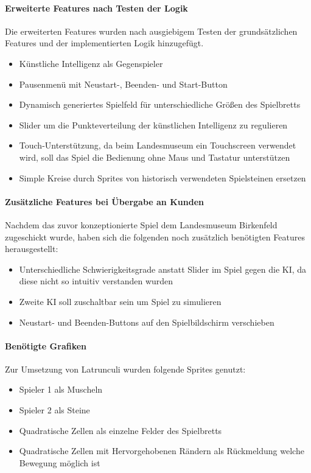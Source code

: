  \paragraph{Erweiterte Features nach Testen der Logik}
 Die erweiterten Features wurden nach ausgiebigem Testen der grundsätzlichen Features und der implementierten Logik hinzugefügt.
 \begin{itemize}
 \item Künstliche Intelligenz als Gegenspieler
 \item Pausenmenü mit Neustart-, Beenden- und Start-Button
 \item Dynamisch generiertes Spielfeld für unterschiedliche Größen des Spielbretts
 \item Slider um die Punkteverteilung der künstlichen Intelligenz zu regulieren
 \item Touch-Unterstützung, da beim Landesmuseum ein Touchscreen verwendet wird, soll das Spiel die Bedienung ohne Maus und Tastatur unterstützen
 \item Simple Kreise durch Sprites von historisch verwendeten Spielsteinen ersetzen
\end{itemize}


\paragraph{Zusätzliche Features bei Übergabe an Kunden}
Nachdem das zuvor konzeptionierte Spiel dem Landesmuseum Birkenfeld zugeschickt wurde, haben sich die folgenden noch zusätzlich benötigten Features herausgestellt:
\begin{itemize}
	\item Unterschiedliche Schwierigkeitsgrade anstatt Slider im Spiel gegen die KI, da diese nicht so intuitiv verstanden wurden
	\item Zweite KI soll zuschaltbar sein um Spiel zu simulieren
	\item Neustart- und Beenden-Buttons auf den Spielbildschirm verschieben	
\end{itemize}


\paragraph{Benötigte Grafiken}
Zur Umsetzung von Latrunculi wurden folgende Sprites genutzt:
\begin{itemize}
	\item Spieler 1 als Muscheln
	\item Spieler 2 als Steine
	\item Quadratische Zellen als einzelne Felder des Spielbretts
	\item Quadratische Zellen mit Hervorgehobenen Rändern als Rückmeldung welche Bewegung möglich ist
\end{itemize}

